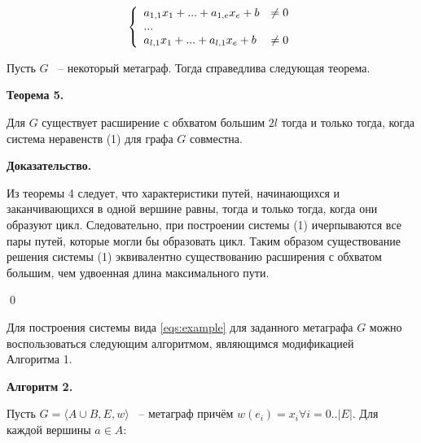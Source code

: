 \documentclass[14pt]{mmcs-article}
\begin{document}
\begin{equation}
    \centering
    \left\{
        \begin{array}{ll}
            a_{1,1} x_1 + ... + a_{1,e} x_e + b &\neq 0\\
            ...\\
            a_{l,1} x_1 + ... + a_{l,1} x_e + b &\neq 0\\
        \end{array}
    \right.
    \label{eqs:example}
\end{equation}

Пусть $G$ ~-- некоторый метаграф. Тогда справедлива следующая теорема.

\textbf{Теорема 5.}

Для $G$ существует расширение с обхватом большим $2l$  тогда и только тогда, когда система неравенств (1) для графа $G$ совместна.

\textbf{Доказательство.}

Из теоремы 4 следует, что характеристики путей, начинающихся и заканчивающихся в одной вершине равны, тогда и только тогда, когда они образуют цикл. Следовательно, при построении системы (1) ичерпываются все пары путей, которые могли бы образовать цикл. Таким образом существование решения системы (1) эквивалентно существованию расширения с обхватом большим, чем удвоенная длина максимального пути.

\qed

Для построения системы вида \ref{eqs:example} для заданного метаграфа $G$ можно воспользоваться следующим алгоритмом, являющимся модификацией\\ Алгоритма 1.

\textbf{Алгоритм 2.}

Пусть $G = \langle A \cup B, E,w\rangle$ ~-- метаграф причём $w(e_i) = x_i \forall i = 0..|E|$. Для каждой вершины $a \in A:$
\end{document}
